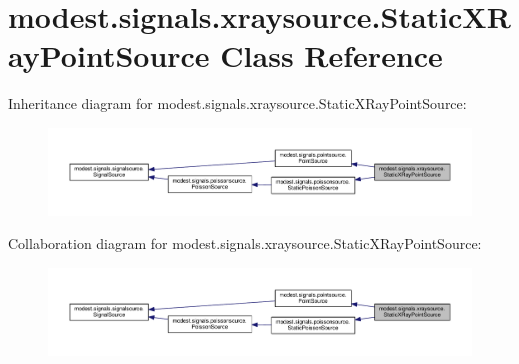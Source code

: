 \hypertarget{classmodest_1_1signals_1_1xraysource_1_1StaticXRayPointSource}{}\section{modest.\+signals.\+xraysource.\+Static\+X\+Ray\+Point\+Source Class Reference}
\label{classmodest_1_1signals_1_1xraysource_1_1StaticXRayPointSource}


Inheritance diagram for modest.\+signals.\+xraysource.\+Static\+X\+Ray\+Point\+Source\+:
\nopagebreak
\begin{figure}[H]
\begin{center}
\leavevmode
\includegraphics[width=350pt]{classmodest_1_1signals_1_1xraysource_1_1StaticXRayPointSource__inherit__graph}
\end{center}
\end{figure}


Collaboration diagram for modest.\+signals.\+xraysource.\+Static\+X\+Ray\+Point\+Source\+:
\nopagebreak
\begin{figure}[H]
\begin{center}
\leavevmode
\includegraphics[width=350pt]{classmodest_1_1signals_1_1xraysource_1_1StaticXRayPointSource__coll__graph}
\end{center}
\end{figure}
